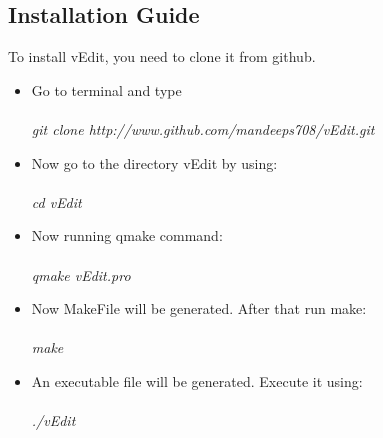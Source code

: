 \subsection{Installation Guide}
To install vEdit, you need to clone it from github.
\begin{itemize}
\item Go to terminal and type\\\\
\textit{git clone http://www.github.com/mandeeps708/vEdit.git}
\item Now go to the directory vEdit by using: \\\\
\textit{cd vEdit}
\item Now running qmake command: \\\\
\textit{qmake vEdit.pro}
\item Now MakeFile will be generated. After that run make: \\\\
\textit{make}
\item An executable file will be generated. Execute it using: \\\\
\textit{./vEdit}
\end{itemize}